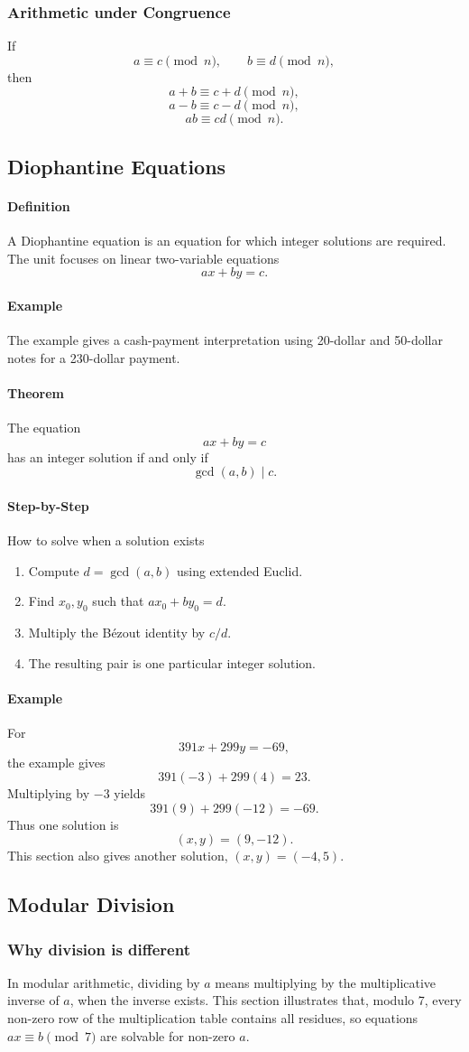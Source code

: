 \documentclass[12pt]{article}
\newcommand{\Definition}{\paragraph{Definition}}
\newcommand{\Step}{\paragraph{Step-by-Step}}
\newcommand{\Example}{\paragraph{Example}}
\newcommand{\Theorem}{\paragraph{Theorem}}
\begin{document}
\subsubsection{Arithmetic under Congruence}
If
\[
a\equiv c\pmod n,\qquad b\equiv d\pmod n,
\]
then
\[
a+b\equiv c+d\pmod n,
\]
\[
a-b\equiv c-d\pmod n,
\]
\[
ab\equiv cd\pmod n.
\]

\subsection{Diophantine Equations}
\Definition A Diophantine equation is an equation for which integer solutions are required. The unit focuses on linear two-variable equations
\[
ax+by=c.
\]

\Example The example gives a cash-payment interpretation using 20-dollar and 50-dollar notes for a 230-dollar payment.

\Theorem The equation
\[
ax+by=c
\]
has an integer solution if and only if
\[
\gcd(a,b)\mid c.
\]

\Step{How to solve when a solution exists}
\begin{enumerate}
    \item Compute $d=\gcd(a,b)$ using extended Euclid.
    \item Find $x_0,y_0$ such that $ax_0+by_0=d$.
    \item Multiply the Bézout identity by $c/d$.
    \item The resulting pair is one particular integer solution.
\end{enumerate}

\Example For
\[
391x+299y=-69,
\]
the example gives
\[
391(-3)+299(4)=23.
\]
Multiplying by $-3$ yields
\[
391(9)+299(-12)=-69.
\]
Thus one solution is
\[
(x,y)=(9,-12).
\]
This section also gives another solution, $(x,y)=(-4,5)$.

\subsection{Modular Division}
\subsubsection{Why division is different}
In modular arithmetic, dividing by $a$ means multiplying by the multiplicative inverse of $a$, when the inverse exists. This section illustrates that, modulo 7, every non-zero row of the multiplication table contains all residues, so equations $ax\equiv b\pmod7$ are solvable for non-zero $a$.
\end{document}
